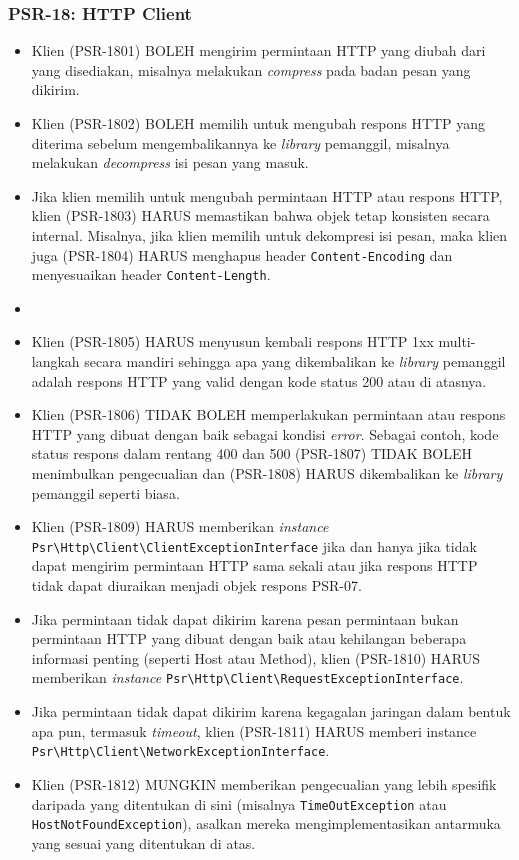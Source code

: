 \subsubsection{PSR-18: HTTP Client}
\label{subsubsec:psr18}
\begin{itemize}
	\item Klien (PSR-1801) BOLEH mengirim permintaan HTTP yang diubah dari yang disediakan, misalnya melakukan \textit{compress} pada badan pesan yang dikirim.
	\item Klien (PSR-1802) BOLEH memilih untuk mengubah respons HTTP yang diterima sebelum mengembalikannya ke \textit{library} pemanggil, misalnya melakukan \textit{decompress} isi pesan yang masuk. 
	\item Jika klien memilih untuk mengubah permintaan HTTP atau respons HTTP, klien (PSR-1803) HARUS memastikan bahwa objek tetap konsisten secara internal. Misalnya, jika klien memilih untuk dekompresi isi pesan, maka klien juga (PSR-1804) HARUS menghapus header \verb|Content-Encoding| dan menyesuaikan header \verb|Content-Length|.
	\item 
	\item Klien (PSR-1805) HARUS menyusun kembali respons HTTP 1xx multi-langkah secara mandiri sehingga apa yang dikembalikan ke \textit{library} pemanggil adalah respons HTTP yang valid dengan kode status 200 atau di atasnya.
	
	\item Klien (PSR-1806) TIDAK BOLEH memperlakukan permintaan atau respons HTTP yang dibuat dengan baik sebagai kondisi \textit{error}. Sebagai contoh, kode status respons dalam rentang 400 dan 500 (PSR-1807) TIDAK BOLEH menimbulkan pengecualian dan (PSR-1808) HARUS dikembalikan ke \textit{library} pemanggil seperti biasa.
	\item Klien (PSR-1809) HARUS memberikan \textit{instance} \verb|Psr\Http\Client\ClientExceptionInterface| jika dan hanya jika tidak dapat mengirim permintaan HTTP sama sekali atau jika respons HTTP tidak dapat diuraikan menjadi objek respons PSR-07.
	\item Jika permintaan tidak dapat dikirim karena pesan permintaan bukan permintaan HTTP yang dibuat dengan baik atau kehilangan beberapa informasi penting (seperti Host atau Method), klien (PSR-1810) HARUS memberikan \textit{instance} \verb|Psr\Http\Client\RequestExceptionInterface|.
	\item Jika permintaan tidak dapat dikirim karena kegagalan jaringan dalam bentuk apa pun, termasuk \textit{timeout}, klien (PSR-1811) HARUS memberi instance \verb|Psr\Http\Client\NetworkExceptionInterface|.
	\item Klien (PSR-1812) MUNGKIN memberikan pengecualian yang lebih spesifik daripada yang ditentukan di sini (misalnya \verb|TimeOutException| atau \verb|HostNotFoundException|), asalkan mereka mengimplementasikan antarmuka yang sesuai yang ditentukan di atas.
\end{itemize}

